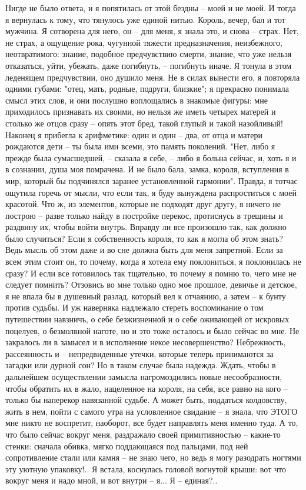 Нигде не  было ответа, и я  попятилась от этой бездны  -- моей и не  моей. И
тогда я вернулась к тому, что  тянулось уже единой нитью. Король, вечер, бал
и тот мужчина. Я сотворена для него, он -- для меня, я знала это, и снова --
страх.  Нет, не  страх, а  ощущение рока,  чугунной тяжести  предназначения,
неизбежного,  неотвратимого: знание,  подобное предчувствию  смерти, знание,
что  уже нельзя  отказаться,  уйти, убежать,  даже  погибнуть, --  погибнуть
иначе. Я тонула  в этом леденящем предчувствии, оно душило  меня. Не в силах
вынести  его,  я повторяла  одними  губами:  "отец, мать,  родные,  подруги,
близкие"; я прекрасно понимала смысл этих слов, и они послушно воплощались в
знакомые фигуры:  мне приходилось признавать  их своими, но нельзя  же иметь
четырех матерей и столько же отцов сразу  -- опять этот бред, такой глупый и
такой назойливый!  Наконец я прибегла к  арифметике: один и один  -- два, от
отца и  матери рождаются дети  -- ты была  ими всеми, это  память поколений.
"Нет, либо я  прежде была сумасшедшей, --  сказала я себе, --  либо я больна
сейчас, и, хоть я  и в сознании, душа моя помрачена. И  не было бала, замка,
короля,  вступления  в  мир,  который бы  подчинялся  заранее  установленной
гармонии". Правда,  я тотчас ощутила горечь  от мысли, что если  так, я буду
вынуждена распроститься  с моей  красотой. Что ж,  из элементов,  которые не
подходят друг другу,  я ничего не построю -- разве  только найду в постройке
перекос, протиснусь в трещины и раздвину  их, чтобы войти внутрь. Вправду ли
все произошло так,  как должно было случиться? Если  я собственность короля,
то как я могла  об этом знать? Ведь мысль об этом даже  и во сне должна быть
для меня запретной.  Если за всем этим  стоит он, то почему,  когда я хотела
ему  поклониться,  я  поклонилась  не  сразу?  И  если  все  готовилось  так
тщательно, то  почему я помню то,  чего мне не следует  помнить? Отзовись во
мне только  одно мое прошлое,  девичье и детское, я  не впала бы  в душевный
разлад, который  вел к  отчаянию, а  затем --  к бунту  против судьбы.  И уж
наверняка  надлежало  стереть воспоминание  о  том  путешествии навзничь,  о
себе  безжизненной и  о себе  оживающей от  искровых поцелуев,  о безмолвной
наготе, но  и это  тоже осталось  и было сейчас  во мне.  Не закралось  ли в
замысел и в исполнение некое  несовершенство? Небрежность, рассеянность и --
непредвиденные утечки, которые теперь принимаются за загадки или дурной сон?
Но  в таком  случае была  надежда. Ждать,  чтобы в  дальнейшем осуществлении
замысла  нагромоздились  новые несообразности,  чтобы  обратить  их в  жало,
нацеленное на  короля, на  себя, все  равно на кого  -- только  бы наперекор
навязанной судьбе. А  может быть, поддаться колдовству, жить в  нем, пойти с
самого  утра на  условленное свидание  -- я  знала, что  ЭТОГО мне  никто не
воспретит, наоборот, все  будет направлять меня именно туда. А  то, что было
сейчас  вокруг меня,  раздражало  своей примитивностью  -- какие-то  стенки:
сначала обивка, мягко поддающаяся под  пальцами, под ней сопротивление стали
или камня  -- не  знаю чего,  но ведь  я могу  разодрать ногтями  эту уютную
упаковку!.. Я встала, коснулась головой  вогнутой крыши: вот что вокруг меня
и надо мной, и вот внутри -- я... Я -- единая?..

